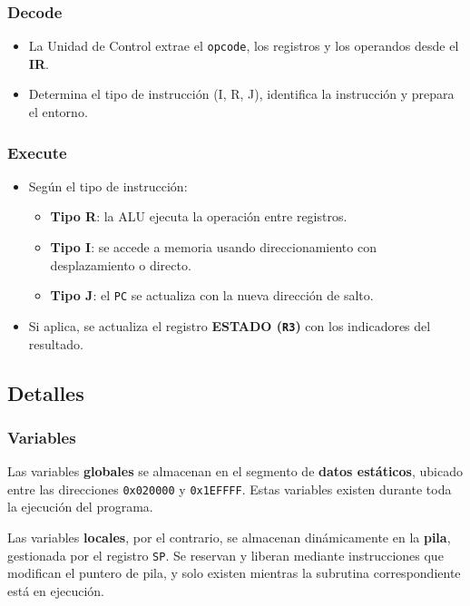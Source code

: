\documentclass{article}
\begin{document}
\subsubsection{Decode}

\begin{itemize}
    \item La Unidad de Control extrae el \texttt{opcode}, los registros y los operandos desde el \textbf{IR}.
    \item Determina el tipo de instrucción (I, R, J), identifica la instrucción y prepara el entorno.
\end{itemize}

\subsubsection{Execute}

\begin{itemize}
    \item Según el tipo de instrucción:
    \begin{itemize}
        \item \textbf{Tipo R}: la ALU ejecuta la operación entre registros.
        \item \textbf{Tipo I}: se accede a memoria usando direccionamiento con desplazamiento o directo.
        \item \textbf{Tipo J}: el \texttt{PC} se actualiza con la nueva dirección de salto.
    \end{itemize}
    \item Si aplica, se actualiza el registro \textbf{ESTADO (\texttt{R3})} con los indicadores del resultado.
\end{itemize}


\subsection{Detalles}

\subsubsection{Variables}

Las variables \textbf{globales} se almacenan en el segmento de 
\textbf{datos estáticos}, ubicado entre las direcciones 
\texttt{0x020000} y \texttt{0x1EFFFF}. Estas variables 
existen durante toda la ejecución del programa.

Las variables \textbf{locales}, por el contrario, se 
almacenan dinámicamente en la \textbf{pila}, gestionada por 
el registro \texttt{SP}. Se reservan y liberan mediante 
instrucciones que modifican el puntero de pila, 
y solo existen mientras la subrutina 
correspondiente está en ejecución.
\end{document}
